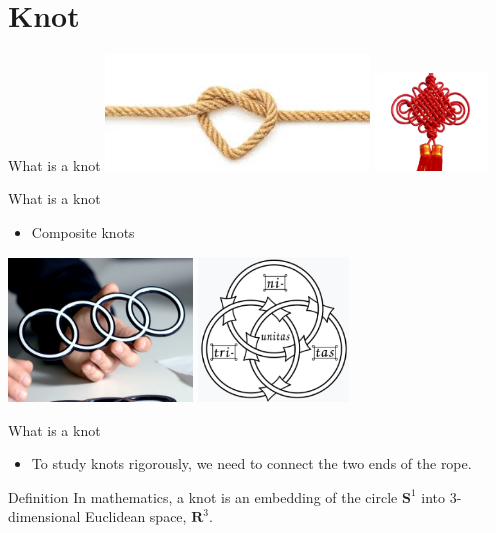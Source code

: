 \section{Knot}
\begin{frame}{What is a knot}
\centering
\includegraphics[width=7cm]{Pictures/images.jpg}
\includegraphics[width=3cm]{Pictures/chineseknot.png}

\end{frame}

\begin{frame}{What is a knot}
    \begin{itemize}
        \item Composite knots
    \end{itemize}
\centering
\includegraphics[width = 4.9cm]{Pictures/audi.jpg}
\includegraphics[width = 4cm]{Pictures/borromean.png}

\end{frame}

\begin{frame}{What is a knot}
\begin{itemize}
    \item To study knots rigorously, we need to connect the two ends of the rope.
\end{itemize}
\begin{kulblock}{Definition}
    In mathematics, a knot is an embedding of the circle $\mathbf{S}^1$ into 3-dimensional Euclidean space, $\mathbf{R}^3$.
\end{kulblock}

\end{frame}

